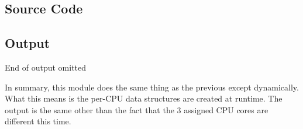 \documentclass{article}
\begin{document}
\subsection{Source Code}

\subsection{Output}
End of output omitted

In summary, this module does the same thing as the previous except dynamically. What this means is the per-CPU data structures are created at runtime. The output is the same other than the fact that the 3 assigned CPU cores are different this time.
\end{document}
